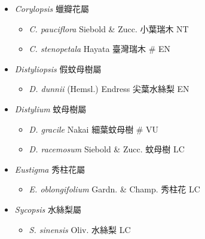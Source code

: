 
  \begin{itemize}
 \item[] \textit{Corylopsis} 蠟瓣花屬
                                
  \begin{itemize}
        \item[] \textit{C. pauciflora} Siebold \& Zucc.  小葉瑞木   NT
        \item[] \textit{C. stenopetala} Hayata  臺灣瑞木  \# EN
  \end{itemize}
 \item[] \textit{Distyliopsis} 假蚊母樹屬
                                
  \begin{itemize}
        \item[] \textit{D. dunnii} (Hemsl.) Endress  尖葉水絲梨   EN
  \end{itemize}
 \item[] \textit{Distylium} 蚊母樹屬
                                
  \begin{itemize}
        \item[] \textit{D. gracile} Nakai  細葉蚊母樹  \# VU
        \item[] \textit{D. racemosum} Siebold \& Zucc.  蚊母樹   LC
  \end{itemize}
 \item[] \textit{Eustigma} 秀柱花屬
                                
  \begin{itemize}
        \item[] \textit{E. oblongifolium} Gardn. \& Champ.  秀柱花   LC
  \end{itemize}
 \item[] \textit{Sycopsis} 水絲梨屬
                                
  \begin{itemize}
        \item[] \textit{S. sinensis} Oliv.  水絲梨   LC
  \end{itemize}
  \end{itemize}
